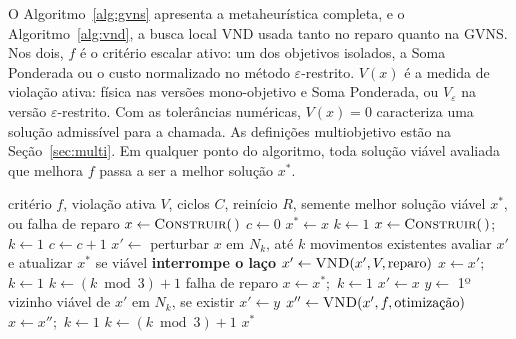 \documentclass[conference]{IEEEtran}
\begin{document}
O Algoritmo~\ref{alg:gvns} apresenta a metaheurística completa, e o Algoritmo~\ref{alg:vnd}, a busca local VND usada tanto no reparo quanto na GVNS. Nos dois, $f$ é o critério escalar ativo: um dos objetivos isolados, a Soma Ponderada ou o custo normalizado no método $\varepsilon$-restrito. $V(x)$ é a medida de violação ativa: física nas versões mono-objetivo e Soma Ponderada, ou $V_\varepsilon$ na versão $\varepsilon$-restrito. Com as tolerâncias numéricas, $V(x)=0$ caracteriza uma solução admissível para a chamada. As definições multiobjetivo estão na Seção~\ref{sec:multi}. Em qualquer ponto do algoritmo, toda solução viável avaliada que melhora $f$ passa a ser a melhor solução $x^*$.

\begin{algorithm}[!t]
\caption{Metaheurística GVNS}
\label{alg:gvns}
\begin{algorithmic}[1]
\Require critério $f$, violação ativa $V$, ciclos $C$, reinício $R$, semente
\Ensure melhor solução viável $x^*$, ou falha de reparo
\State $x \gets \Call{Construir}{\,}$
\State $c \gets 0$
    \State $x^* \gets x$
\Else
    \State $k \gets 1$
            \State $x \gets \Call{Construir}{\,}$;\ $k \gets 1$
        \EndIf
        \State $c \gets c + 1$
        \State $x' \gets$ perturbar $x$ em $N_k$, até $k$ movimentos existentes
        \State avaliar $x'$ e atualizar $x^*$ se viável
         \State \textbf{interrompe o laço} \EndIf
        \State $x' \gets \Call{VND}{x', V, \text{reparo}}$
            \State $x \gets x'$;\ $k \gets 1$
        \Else
            \State $k \gets (k \bmod 3) + 1$
        \EndIf
    \EndWhile
\EndIf
{} \State \Return falha de reparo \EndIf
\State $x \gets x^*$;\ $k \gets 1$
    \State $x' \gets x$
        \State $y \gets$ 1º vizinho viável de $x'$ em $N_k$, se existir
         \State $x' \gets y$ \EndIf
    \EndFor
    \State $x'' \gets \Call{VND}{x', f, \text{otimização}}$
        \State $x \gets x''$;\ $k \gets 1$
    \Else
        \State $k \gets (k \bmod 3) + 1$
    \EndIf
\EndFor
\State \Return $x^*$
\end{algorithmic}
\end{algorithm}
\end{document}
